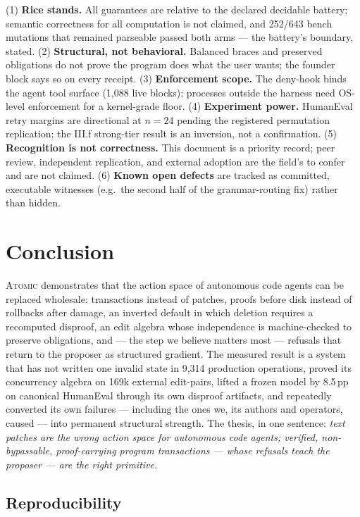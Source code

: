(1) \textbf{Rice stands.} All guarantees are relative to the declared decidable
battery; semantic correctness for all computation is not claimed, and 252/643
bench mutations that remained parseable passed both arms --- the battery's
boundary, stated. (2) \textbf{Structural, not behavioral.} Balanced braces and
preserved obligations do not prove the program does what the user wants; the
founder block says so on every receipt. (3) \textbf{Enforcement scope.} The
deny-hook binds the agent tool surface (1{,}088 live blocks); processes outside
the harness need OS-level enforcement for a kernel-grade floor. (4)
\textbf{Experiment power.} HumanEval retry margins are directional at $n{=}24$
pending the registered permutation replication; the III.f strong-tier result is
an inversion, not a confirmation. (5) \textbf{Recognition is not correctness.}
This document is a priority record; peer review, independent replication, and
external adoption are the field's to confer and are not claimed. (6)
\textbf{Known open defects} are tracked as committed, executable witnesses
(e.g.\ the second half of the grammar-routing fix) rather than hidden.

\section{Conclusion}

\textsc{Atomic} demonstrates that the action space of autonomous code agents can
be replaced wholesale: transactions instead of patches, proofs before disk
instead of rollbacks after damage, an inverted default in which deletion requires
a recomputed disproof, an edit algebra whose independence is machine-checked to
preserve obligations, and --- the step we believe matters most --- refusals that
return to the proposer as structured gradient. The measured result is a system
that has not written one invalid state in 9{,}314 production operations, proved
its concurrency algebra on 169k external edit-pairs, lifted a frozen model by
8.5\,pp on canonical HumanEval through its own disproof artifacts, and repeatedly
converted its own failures --- including the ones we, its authors and operators,
caused --- into permanent structural strength. The thesis, in one sentence:
\emph{text patches are the wrong action space for autonomous code agents;
verified, non-bypassable, proof-carrying program transactions --- whose refusals
teach the proposer --- are the right primitive.}

\subsection*{Reproducibility}

